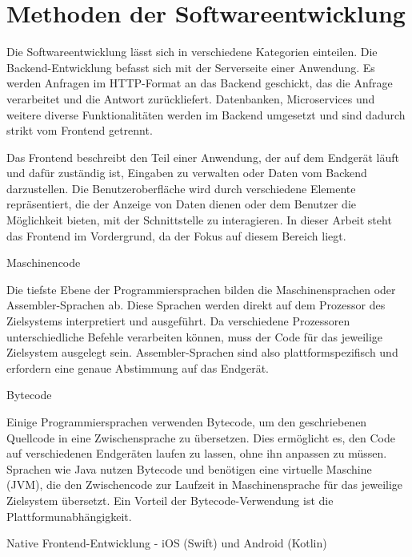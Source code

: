 \section{Methoden der Softwareentwicklung}
Die Softwareentwicklung lässt sich in verschiedene Kategorien einteilen. Die Backend-Entwicklung befasst sich mit der Serverseite einer Anwendung. Es werden Anfragen im HTTP-Format an das Backend geschickt, das die Anfrage verarbeitet und die Antwort zurückliefert. Datenbanken, Microservices und weitere diverse Funktionalitäten werden im Backend umgesetzt und sind dadurch strikt vom Frontend getrennt.

\vspace{0.5cm}

Das Frontend beschreibt den Teil einer Anwendung, der auf dem Endgerät läuft und dafür zuständig ist, Eingaben zu verwalten oder Daten vom Backend darzustellen. Die Benutzeroberfläche wird durch verschiedene Elemente repräsentiert, die der Anzeige von Daten dienen oder dem Benutzer die Möglichkeit bieten, mit der Schnittstelle zu interagieren. In dieser Arbeit steht das Frontend im Vordergrund, da der Fokus auf diesem Bereich liegt.

\vspace{0.5cm}

Maschinencode

Die tiefste Ebene der Programmiersprachen bilden die Maschinensprachen oder Assembler-Sprachen ab. Diese Sprachen werden direkt auf dem Prozessor des Zielsystems interpretiert und ausgeführt. Da verschiedene Prozessoren unterschiedliche Befehle verarbeiten können, muss der Code für das jeweilige Zielsystem ausgelegt sein. Assembler-Sprachen sind also plattformspezifisch und erfordern eine genaue Abstimmung auf das Endgerät.

\vspace{0.5cm}

Bytecode

Einige Programmiersprachen verwenden Bytecode, um den geschriebenen Quellcode in eine Zwischensprache zu übersetzen. Dies ermöglicht es, den Code auf verschiedenen Endgeräten laufen zu lassen, ohne ihn anpassen zu müssen. Sprachen wie Java nutzen Bytecode und benötigen eine virtuelle Maschine (JVM), die den Zwischencode zur Laufzeit in Maschinensprache für das jeweilige Zielsystem übersetzt. Ein Vorteil der Bytecode-Verwendung ist die Plattformunabhängigkeit.

\vspace{0.5cm}

Native Frontend-Entwicklung - iOS (Swift) und Android (Kotlin)

